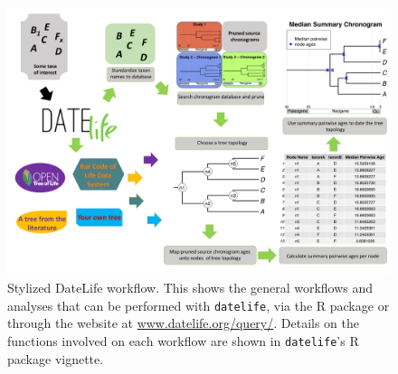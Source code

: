 
\begin{figure}[!h]
\includegraphics{../figures/figure1/figure1-vertical-final.pdf}
\caption{Stylized DateLife workflow. This shows the general workflows and analyses that can be performed with \texttt{datelife}, via the R package or through the website  at \url{www.datelife.org/query/}. Details on the functions involved on each workflow are shown in \texttt{datelife}'s R package vignette.}
\label{fig:workflow}
\end{figure}
\newpage
